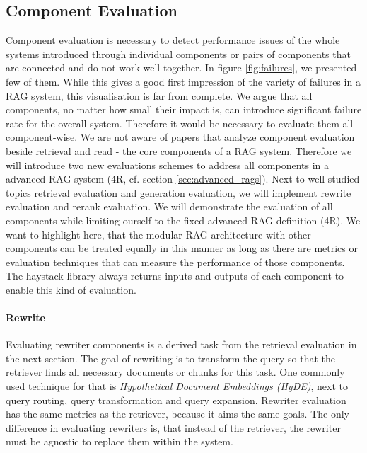 

\subsection{Component Evaluation}

Component evaluation is necessary to detect performance issues of the whole systems introduced through individual components or pairs of components that are connected and do not work well together.\cite{Salemi.2024} In figure \ref{fig:failures}, we presented few of them. While this gives a good first impression of the variety of failures in a RAG system, this visualisation is far from complete. We argue that all components, no matter how small their impact is, can introduce significant failure rate for the overall system. Therefore it would be necessary to evaluate them all component-wise. We are not aware of papers that analyze component evaluation beside retrieval and read - the core components of a RAG system. Therefore we will introduce two new evaluations schemes to address all components in a advanced RAG system (4R, cf. section \ref{sec:advanced_rags}). Next to well studied topics retrieval evaluation and generation evaluation, we will implement rewrite evaluation and rerank evaluation. We will demonstrate the evaluation of all components while limiting ourself to the fixed advanced RAG definition (4R). We want to highlight here, that the modular RAG architecture with other components can be treated equally in this manner as long as there are metrics or evaluation techniques that can measure the performance of those components. The haystack library always returns inputs and outputs of each component to enable this kind of evaluation.

\paragraph{Rewrite}

Evaluating rewriter components is a derived task from the retrieval evaluation in the next section. The goal of rewriting is to transform the query so that the retriever finds all necessary documents or chunks for this task. One commonly used technique for that is \textit{Hypothetical Document Embeddings (HyDE)}\cite{Gao.2023}, next to query routing, query transformation and query expansion. Rewriter evaluation has the same metrics as the retriever, because it aims the same goals. The only difference in evaluating rewriters is, that instead of the retriever, the rewriter must be agnostic to replace them within the system. 

